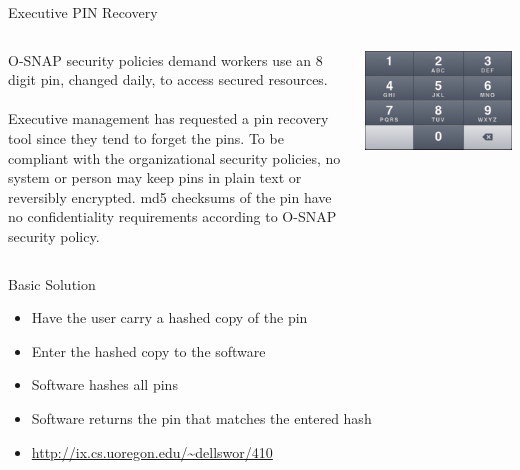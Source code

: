 \documentclass[xcolor=dvipsnames]{beamer}
\begin{document}
	\begin{frame}{Executive PIN Recovery}
		\begin{columns}
			\begin{column}{0.5\textwidth}
					O-SNAP security policies demand workers use an 8 digit pin, changed daily, to 
					access secured resources. \\~\\
					Executive management has requested a pin recovery tool since they tend to forget 
					the pins. To be compliant with the organizational security policies, no system or 
					person may keep pins in plain text or reversibly encrypted. md5 checksums of the 
					pin have no confidentiality requirements according to O-SNAP security policy.
			\end{column}
			\begin{column}{0.5\textwidth}
				\includegraphics[width=\textwidth]{images/keypad}
			\end{column}
		\end{columns}
	\end{frame}
	
	\begin{frame}{Basic Solution}
		\begin{itemize}
			\item Have the user carry a hashed copy of the pin
			\item Enter the hashed copy to the software
			\item Software hashes all pins
			\item Software returns the pin that matches the entered hash
			\item \href{http://ix.cs.uoregon.edu/~dellswor/410}{\url{http://ix.cs.uoregon.edu/~dellswor/410}}
		\end{itemize}
	\end{frame}
	
		
	
\end{document}
